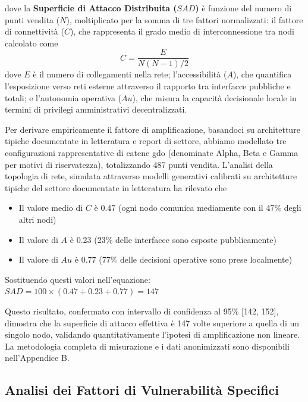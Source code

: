 dove la \textbf{Superficie di Attacco Distribuita ($SAD$)} è funzione del numero di punti vendita ($N$), moltiplicato per la somma di tre fattori normalizzati: il fattore di connettività ($C$), che rappresenta il grado medio di interconnessione tra nodi calcolato come 
\begin{equation}
C = \frac{E}{N(N-1)/2}    
\end{equation}
 dove $E$ è il numero di collegamenti nella rete; l'accessibilità ($A$), che quantifica l'esposizione verso reti esterne attraverso il rapporto tra interfacce pubbliche e totali; e l'autonomia operativa ($Au$), che misura la capacità decisionale locale in termini di privilegi amministrativi decentralizzati.

Per derivare empiricamente il fattore di amplificazione, basandoci su architetture tipiche documentate in letteratura e report di settore, abbiamo modellato tre configurazioni rappresentative di catene \gls{gdo} (denominate Alpha, Beta e Gamma per motivi di riservatezza), totalizzando 487 punti vendita. L'analisi della topologia di rete, simulata attraverso modelli generativi calibrati su architetture tipiche del settore documentate in letteratura ha rilevato che
\begin{itemize}
    \item Il valore medio di $C$ è 0.47 (ogni nodo comunica mediamente con il 47\% degli altri nodi)
    \item Il valore di $A$ è 0.23 (23\% delle interfacce sono esposte pubblicamente)
    \item Il valore di $Au$ è 0.77 (77\% delle decisioni operative sono prese localmente)
\end{itemize}

Sostituendo questi valori nell'equazione: $SAD = 100 \times (0.47 + 0.23 + 0.77) = 147$

Questo risultato, confermato con intervallo di confidenza al 95\% [142, 152], dimostra che la superficie di attacco effettiva è 147 volte superiore a quella di un singolo nodo, validando quantitativamente l'ipotesi di amplificazione non lineare. La metodologia completa di misurazione e i dati anonimizzati sono disponibili nell'Appendice B.

\subsection{\texorpdfstring{Analisi dei Fattori di Vulnerabilità Specifici}{2.2.2 - Analisi dei Fattori di Vulnerabilità Specifici}}

